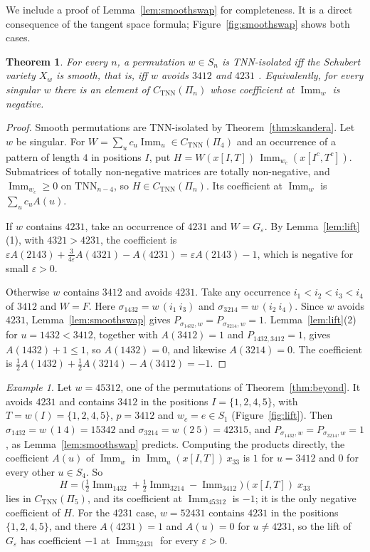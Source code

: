 \documentclass[11pt]{amsart}
\newtheorem{theorem}{Theorem}[section]
\theoremstyle{definition}
\theoremstyle{remark}
\newtheorem{exa}{Example}[section]
\newcommand{\Imm}{\operatorname{Imm}}
\newcommand{\TNN}{\mathrm{TNN}}
\newcommand{\CTNN}{C_{\mathrm{TNN}}}
\begin{document}
We include a proof of Lemma~\ref{lem:smoothswap} for completeness. It is a direct consequence of the tangent space formula; Figure~\ref{fig:smoothswap} shows both cases.

\begin{theorem}\label{thm:isolated}
For every $n$, a permutation $w\in S_n$ is TNN-isolated iff the Schubert variety $X_w$ is smooth, that is, iff $w$ avoids $3412$ and $4231$ \cite{LS}. Equivalently, for every singular $w$ there is an element of $\CTNN(\Pi_n)$ whose coefficient at $\Imm_w$ is negative.
\end{theorem}

\begin{proof}
Smooth permutations are TNN-isolated by Theorem~\ref{thm:skandera}. Let $w$ be singular. For $W=\sum_uc_u\Imm_u\in\CTNN(\Pi_4)$ and an occurrence of a pattern of length $4$ in positions $I$, put $H=W(x[I,T])\,\Imm_{w_c}(x[I^c,T^c])$. Submatrices of totally non-negative matrices are totally non-negative, and $\Imm_{w_c}\ge0$ on $\TNN_{n-4}$, so $H\in\CTNN(\Pi_n)$. Its coefficient at $\Imm_w$ is $\sum_uc_uA(u)$.

If $w$ contains $4231$, take an occurrence of $4231$ and $W=G_\varepsilon$. By Lemma~\ref{lem:lift}(1), with $4321>4231$, the coefficient is $\varepsilon A(2143)+\tfrac3{4\varepsilon}A(4321)-A(4231)=\varepsilon A(2143)-1$, which is negative for small $\varepsilon>0$.

Otherwise $w$ contains $3412$ and avoids $4231$. Take any occurrence $i_1<i_2<i_3<i_4$ of $3412$ and $W=F$. Here $\sigma_{1432}=w\,(i_1\ i_3)$ and $\sigma_{3214}=w\,(i_2\ i_4)$. Since $w$ avoids $4231$, Lemma~\ref{lem:smoothswap} gives $P_{\sigma_{1432},w}=P_{\sigma_{3214},w}=1$. Lemma~\ref{lem:lift}(2) for $u=1432<3412$, together with $A(3412)=1$ and $P_{1432,3412}=1$, gives $A(1432)+1\le1$, so $A(1432)=0$, and likewise $A(3214)=0$. The coefficient is $\tfrac12A(1432)+\tfrac12A(3214)-A(3412)=-1$.
\end{proof}

\begin{exa}\label{exa:lift}
Let $w=45312$, one of the permutations of Theorem~\ref{thm:beyond}. It avoids $4231$ and contains $3412$ in the positions $I=\{1,2,4,5\}$, with $T=w(I)=\{1,2,4,5\}$, $p=3412$ and $w_c=e\in S_1$ (Figure~\ref{fig:lift}). Then $\sigma_{1432}=w\,(1\ 4)=15342$ and $\sigma_{3214}=w\,(2\ 5)=42315$, and $P_{\sigma_{1432},w}=P_{\sigma_{3214},w}=1$, as Lemma~\ref{lem:smoothswap} predicts. Computing the products directly, the coefficient $A(u)$ of $\Imm_w$ in $\Imm_u(x[I,T])\,x_{33}$ is $1$ for $u=3412$ and $0$ for every other $u\in S_4$. So
\[
H=\bigl(\tfrac12\Imm_{1432}+\tfrac12\Imm_{3214}-\Imm_{3412}\bigr)(x[I,T])\;x_{33}
\]
lies in $\CTNN(\Pi_5)$, and its coefficient at $\Imm_{45312}$ is $-1$; it is the only negative coefficient of $H$. For the $4231$ case, $w=52431$ contains $4231$ in the positions $\{1,2,4,5\}$, and there $A(4231)=1$ and $A(u)=0$ for $u\ne4231$, so the lift of $G_\varepsilon$ has coefficient $-1$ at $\Imm_{52431}$ for every $\varepsilon>0$.
\end{exa}
\end{document}
